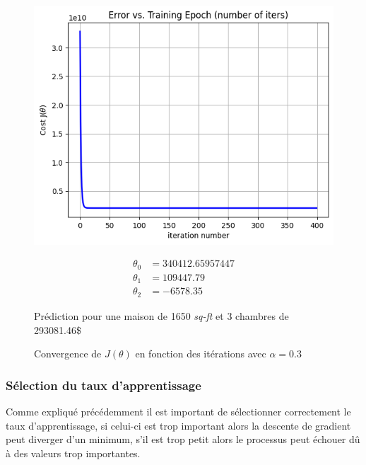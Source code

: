\begin{figure}[!h]
    \begin{minipage}{.48\linewidth}
        \begin{center}
            \includegraphics[width=1\textwidth]{./img/5-2.png}
            \caption{\label{fig:fig4}Convergence de $J(\theta)$ en fonction des itérations avec $\alpha = 0.3$}  
        \end{center}
    \end{minipage}\hfill
    \begin{minipage}{.48\linewidth}
        \begin{equation*}
            \begin{aligned}
                \theta_0 &= 340412.65957447 \\
                \theta_1 &= 109447.79 \\
                \theta_2 &= -6578.35
            \end{aligned}
        \end{equation*}  

        Prédiction pour une maison de 1650 \textit{sq-ft} et 3 chambres de 293081.46\$
    \end{minipage}
\end{figure}


\subsubsection{Sélection du taux d'apprentissage}

Comme expliqué précédemment il est important de sélectionner correctement le taux d'apprentissage, si celui-ci est trop important alors la descente de gradient peut diverger d'un minimum, s’il est trop petit alors le processus peut échouer dû à des 
valeurs trop importantes.

